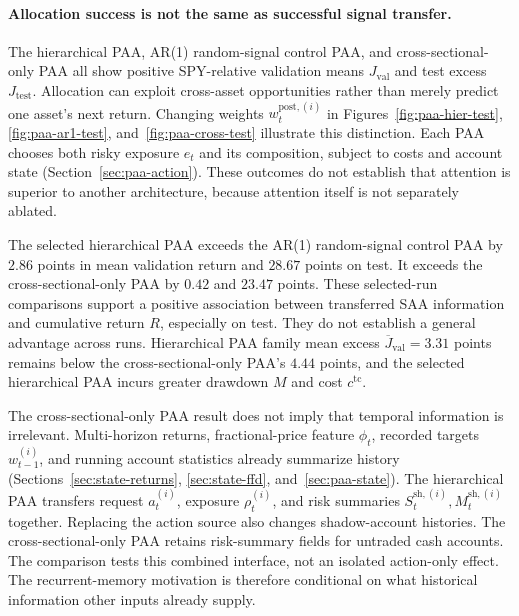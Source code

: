 \paragraph{Allocation success is not the same as successful signal transfer.}
The hierarchical PAA, AR(1) random-signal control PAA, and cross-sectional-only PAA all show positive SPY-relative validation means \(J_{\mathrm{val}}\) and test excess \(J_{\mathrm{test}}\). Allocation can exploit cross-asset opportunities rather than merely predict one asset's next return. Changing weights \(w_t^{\mathrm{post},(i)}\) in Figures~\ref{fig:paa-hier-test}, \ref{fig:paa-ar1-test}, and~\ref{fig:paa-cross-test} illustrate this distinction. Each PAA chooses both risky exposure \(e_t\) and its composition, subject to costs and account state (Section~\ref{sec:paa-action}). These outcomes do not establish that attention is superior to another architecture, because attention itself is not separately ablated.

The selected hierarchical PAA exceeds the AR(1) random-signal control PAA by \(2.86\) points in mean validation return and \(28.67\) points on test. It exceeds the cross-sectional-only PAA by \(0.42\) and \(23.47\) points. These selected-run comparisons support a positive association between transferred SAA information and cumulative return \(R\), especially on test. They do not establish a general advantage across runs. Hierarchical PAA family mean excess \(\overline J_{\mathrm{val}}=3.31\) points remains below the cross-sectional-only PAA's \(4.44\) points, and the selected hierarchical PAA incurs greater drawdown \(M\) and cost \(c^{\mathrm{tc}}\).

The cross-sectional-only PAA result does not imply that temporal information is irrelevant. Multi-horizon returns, fractional-price feature \(\phi_t\), recorded targets \(w_{t-1}^{(i)}\), and running account statistics already summarize history (Sections~\ref{sec:state-returns}, \ref{sec:state-ffd}, and~\ref{sec:paa-state}). The hierarchical PAA transfers request \(a_t^{(i)}\), exposure \(\rho_t^{(i)}\), and risk summaries \(S_t^{\mathrm{sh},(i)},M_t^{\mathrm{sh},(i)}\) together. Replacing the action source also changes shadow-account histories. The cross-sectional-only PAA retains risk-summary fields for untraded cash accounts. The comparison tests this combined interface, not an isolated action-only effect. The recurrent-memory motivation \cite{hausknecht2015deep} is therefore conditional on what historical information other inputs already supply.

